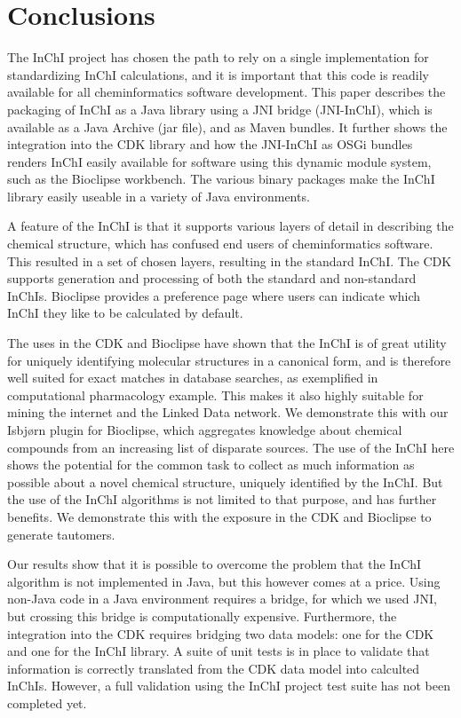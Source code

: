 \documentclass[10pt]{bmc_article}
\newenvironment{bmcformat}{\fussy\setboolean{publ}{true}}{\fussy}
\begin{document}
\begin{bmcformat}
\section*{Conclusions}
The InChI project has chosen the path to rely on a single implementation for standardizing InChI calculations,
and it is important that this code is readily available for all cheminformatics software development. This paper
describes the packaging of InChI as a Java library using a JNI bridge (JNI-InChI), which is available as a Java
Archive (jar file), and as Maven bundles. It further shows the integration into the CDK library and
how the JNI-InChI as OSGi bundles renders InChI easily available for software using this dynamic module system,
such as the Bioclipse workbench. The various binary packages make the InChI library easily useable in
a variety of Java environments.

A feature of the InChI is that it supports various layers of detail in describing the chemical structure,
which has confused end users of cheminformatics software. This resulted in a set of chosen layers, resulting
in the standard InChI. The CDK supports generation and processing of both the standard and non-standard InChIs.
Bioclipse provides a preference page where users can indicate which InChI they like to be calculated by
default.

The uses in the CDK and Bioclipse have shown that the InChI is of great utility for uniquely identifying
molecular structures in a canonical form, and is therefore well suited for exact matches in database searches, 
as exemplified in computational pharmacology example. This makes it also highly suitable for mining the
internet and the Linked Data network. We demonstrate this with our Isbjørn plugin for Bioclipse, which
aggregates knowledge about chemical compounds from an increasing list of disparate sources. The use of the
InChI here shows the potential for the common task to collect as much information as possible about a
novel chemical structure, uniquely identified by the InChI. But the use of the InChI algorithms is not limited to
that purpose, and has further benefits. We demonstrate this with the exposure in the CDK and Bioclipse to
generate tautomers. 

Our results show that it is possible to overcome the problem that the InChI algorithm is not implemented
in Java, but this however comes at a price. Using non-Java code in a Java environment requires a bridge, for which
we used JNI, but crossing this bridge is computationally expensive. Furthermore, the integration into the
CDK requires bridging two data models: one for the CDK and one for the InChI library. A suite of unit
tests is in place to validate that information is correctly translated from the CDK data model into
calculted InChIs. However, a full validation using the InChI project test suite has not been completed
yet.


\end{bmcformat}
\end{document}
